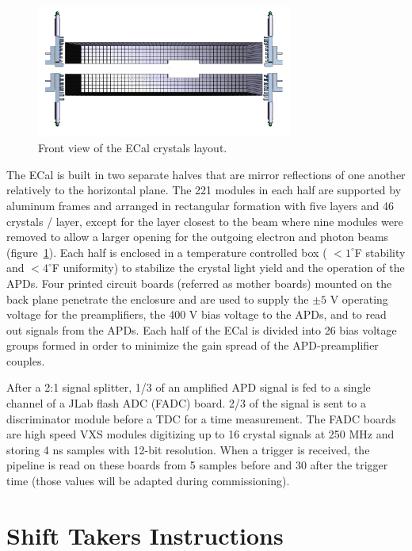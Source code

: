 \documentclass[12pt]{article}
\begin{document}
\begin{figure}[hp]
\center
\includegraphics[width=0.75\textwidth]{pics/ECal2.png}
\caption{\small \label{Crystals} Front view of the ECal crystals layout.}
\end{figure}
      
The ECal is built in two separate halves that are mirror reflections of one another relatively to the horizontal plane. The 221 modules in each half are supported by aluminum frames and arranged in rectangular formation with five layers and 46 crystals / layer, except for the layer closest to the beam where nine modules were removed to allow a larger opening for the outgoing electron and photon beams (figure~\ref{Crystals}). Each half is enclosed in a temperature controlled box ( $< 1^\circ$F stability and $< 4^\circ$F uniformity) to stabilize the crystal light yield and the operation of the APDs. Four printed circuit boards (referred as mother boards) mounted on the back plane penetrate the enclosure and are used to supply the $\pm5$ V operating voltage for the preamplifiers, the 400 V bias voltage to the APDs, and to read out signals from the APDs. Each half of the ECal is divided into 26 bias voltage groups formed in order to minimize the gain spread of the APD-preamplifier couples.


After a 2:1 signal splitter, 1/3 of an amplified APD signal is fed to a single channel of a JLab flash ADC (FADC) board. 2/3 of the signal is sent to a discriminator module before a TDC for a time measurement. The FADC boards are high speed VXS modules digitizing up to 16 crystal signals at 250 MHz and storing 4 ns samples with 12-bit resolution. When a trigger is received, the pipeline is read on these boards from 5 samples before and 30 after the trigger time (those values will be adapted during commissioning).

\newpage
 \twocolumn
\part{Shift Takers Instructions}
\end{document}
